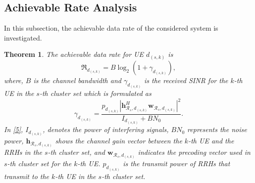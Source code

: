\documentclass[conference,10pt,twocolumn,letter]{IEEEtran}
\newtheorem{theorem}{Theorem}
\begin{document}
\subsection{Achievable Rate Analysis}
In this subsection, the achievable data rate of the considered system is investigated. 
\begin{theorem}\label{t1}
The achievable data rate for UE $d_{(s,k)}$ is
\begin{equation}\label{e1}
\mathfrak{R}_{d_{(s,k)}} = B \log_2(1+\gamma_{d_{(s,k)}}),
\end{equation}
where, $B$ is the channel bandwidth and $\gamma_{d_{(s,k)}}$ is the received SINR for the $k$-th UE in the $s$-th cluster set which is formulated as
\begin{equation}\label{5}
\gamma_{d_{(s,k)}}= \frac{p_{d_{(s,k)}}|\boldsymbol{h}_{\mathcal{R}_s, d_{(s,k)}}^H \boldsymbol{w}_{\mathcal{R}_{s},d_{(s,k)}}|^2}{I_{d_{(s,k)}}+BN_0}.
\end{equation}
In \eqref{5}, $I_{d_{(s,k)}}$, denotes the power of interfering signals, $BN_0$ represents the noise power, $\boldsymbol{h}_{\mathcal{R}_s, d_{(s,k)}}$ shows the channel gain vector between the $k$-th UE and the RRHs in the $s$-th cluster set, and $\boldsymbol{w}_{\mathcal{R}_{s},d_{(s,k)}}$ indicates the precoding vector used in $s$-th cluster set for the $k$-th UE.
$p_{d_{(s,k)}}$ is the transmit power of RRHs that transmit to the $k$-th UE in the $s$-th cluster set.
\end{theorem}
\end{document}
